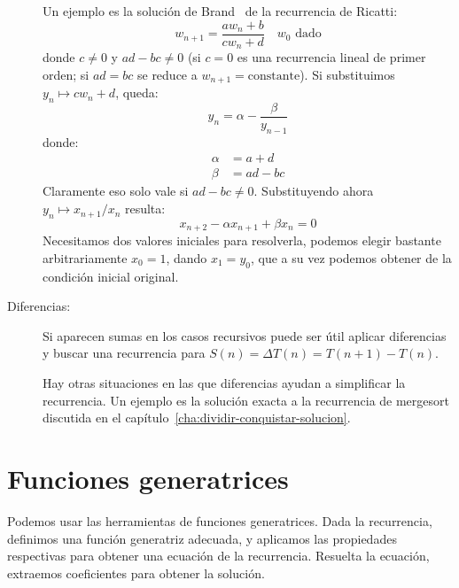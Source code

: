 \begin{description}
    Un ejemplo es la solución de Brand~%
      \cite{brand55:_seq_def_difference_eq}
    de la recurrencia de Ricatti:
    \begin{equation*}
      w_{n + 1}
        = \frac{a w_n + b}{c w_n + d}
        \quad w_0 \text{\ dado}
    \end{equation*}
    donde \(c \ne 0\)
    y \(a d - b c \ne 0\)
    (si \(c = 0\) es una recurrencia lineal de primer orden;
    si \(a d = b c\) se reduce a \(w_{n + 1} = \text{constante}\)).
    Si substituimos \(y_n \mapsto c w_n + d\),
    queda:
    \begin{equation*}
      y_n
        = \alpha - \frac{\beta}{y_{n - 1}}
    \end{equation*}
    donde:
    \begin{align*}
      \alpha
        &= a + d \\
      \beta
        &= a d - b c
    \end{align*}
    Claramente eso solo vale si \(a d - b c \ne 0\).
    Substituyendo ahora \(y_n \mapsto x_{n + 1} / x_n\)
    resulta:
    \begin{equation*}
      x_{n + 2} - \alpha x_{n + 1} + \beta x_n
        = 0
    \end{equation*}
    Necesitamos dos valores iniciales para resolverla,
    podemos elegir bastante arbitrariamente \(x_0 = 1\),
    dando \(x_1 = y_0\),
    que a su vez podemos obtener de la condición inicial original.
  \item[Diferencias:]
    Si aparecen sumas en los casos recursivos
    puede ser útil aplicar diferencias
    y buscar una recurrencia para \(S(n) = \Delta T(n) = T(n + 1) - T(n)\).

    Hay otras situaciones en las que diferencias ayudan a simplificar
    la recurrencia.
    Un ejemplo es la solución exacta a la recurrencia de mergesort
    discutida en el capítulo~\ref{cha:dividir-conquistar-solucion}.
  \end{description}

\section{Funciones generatrices}
\label{sec:recurrencias-funciones-generatrices}

  Podemos usar las herramientas de funciones generatrices.
  Dada la recurrencia,
  definimos una función generatriz adecuada,
  y aplicamos las propiedades respectivas para obtener una ecuación
  de la recurrencia.
  Resuelta la ecuación,
  extraemos coeficientes para obtener la solución.

